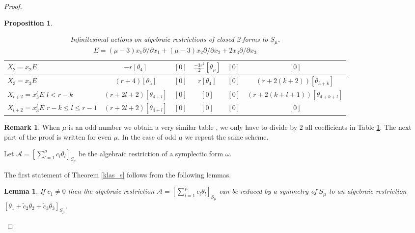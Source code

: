 \documentclass{amsart}
\newtheorem{lem}[thm]{Lemma}
\newtheorem{prop}[thm]{Proposition}
\theoremstyle{definition}
\newtheorem{rem}[thm]{Remark}
\numberwithin{equation}{section}
\begin{document}
\begin{proof}
\begin{prop}
\begin{footnotesize}
\begin{table}[h]
\begin{center}
\begin{tabular}{|p{1.7cm}|c|c|c|c|c|}
   $X_2\!=\!x_2E$ & $-r[\theta_4]$ &  $[0]$  &$\frac{-3r^2}{2}[\theta_{\mu}]$ & $[0]$ & $ [0]$ \\   \hline

   $X_3\!=\!x_3E$  & $(r\!+\!4)[\theta_5]$& $ [0]$ & $r[\theta_4]$  & $[0]$ &  $(r\!+\!2(k\!+\!2))[\theta_{5+k}]$ \\       \hline

 $X_{l+2}\!=\!x_3^lE$ \newline \;\; $l\!<r\!-\!k$
  &  $(r\!+\!2l\!+\!2)[\theta_{4\!+\!l}]$ & $ [0]$ & $[0]$ & $[0]$ &  $(r\!+\!2(k\!+\!l\!+\!1))[\theta_{4\!+\!k\!+\!l}]$ \\       \hline

$X_{l+2}\!=\!x_3^lE$ \newline \;\; $r\!-\!k\!\leq\!l\!\leq\!r\!-\!1$
  &  $(r\!+\!2l\!+\!2)[\theta_{4\!+\!l}]$ &$ [0]$ & $[0]$ & $[0]$ &  $[0]$ \\       \hline

\end{tabular}
\end{center}

\caption{Infinitesimal actions on algebraic restrictions of closed
2-forms to  $S_{\mu}$. $E=(\mu-3)x_1 \partial /\partial x_1+ (\mu-3)x_2 \partial /\partial x_2+ 2x_3 \partial /\partial x_3$}\label{infini s}
\end{table}
\end{footnotesize}

\end{prop}

\begin{rem} When $\mu$ is an odd number we obtain a very similar table , we only have  to divide by $2$ all coefficients in  Table \ref{infini s}. The next part of the proof is written for even $\mu$. In the case of odd $\mu$ we repeat the same scheme.
\end{rem}

\medskip

Let $\mathcal{A}=[ \sum_{l=1}^{\mu}c_{l} \theta_{l}]_{S_{\mu}}$
be the algebraic restriction of a symplectic form $\omega$.

\medskip

The first statement of Theorem \ref{klas_s} follows from the following lemmas.

\begin{lem}
\label{slem1} If \;$ c_1\ne 0$\; then the algebraic restriction  $\mathcal{A}=[ \sum_{l=1}^{\mu}c_{l} \theta_{l}]_{S_{\mu}}$ can be reduced by a symmetry of $S_{\mu}$ to an algebraic restriction $[\theta_1+ \widetilde{c}_2\theta_2+\widetilde{c}_3 \theta_3]_{S_{\mu}}$.
\end{lem}


\end{proof}
\end{document}
